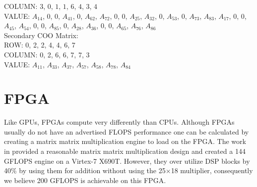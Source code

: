 COLUMN: $3$, $0$, $1$, $1$, $6$, $4$, $3$, $4$ \\
VALUE: $A_{14}$, $0$, $0$, $A_{41}$, $0$, $A_{62}$, $A_{72}$, $0$, $0$, $A_{25}$, $A_{32}$, $0$, $A_{53}$, $0$, $A_{73}$, $A_{83}$, $A_{17}$, $0$, $0$, $A_{45}$, $A_{54}$, $0$, $0$, $A_{85}$, $0$, $A_{28}$, $A_{36}$, $0$, $0$, $A_{65}$, $A_{76}$, $A_{86}$ \\
Secondary COO Matrix:\\
ROW: 0, 2, 2, 4, 4, 6, 7\\
COLUMN: 0, 2, 6, 6, 7, 7, 3\\
VALUE: $A_{11}$, $A_{33}$, $A_{37}$, $A_{57}$, $A_{58}$, $A_{78}$, $A_{84}$\par
\section{FPGA} 
\label{sec:fpga}
Like GPUs, FPGAs compute very differently than CPUs. Although FPGAs usually do not have an advertised FLOPS performance one can be calculated by creating a matrix matrix multiplication engine to load on the FPGA. The work in \cite{prelim:cappello} provided a reasonable matrix matrix multiplication design and created a 144 GFLOPS engine on a Virtex-7 X690T. However, they over utilize DSP blocks by 40\% by using them for addition without using the 25$\times$18 multiplier, consequently we believe 200 GFLOPS is achievable on this FPGA. \par 
